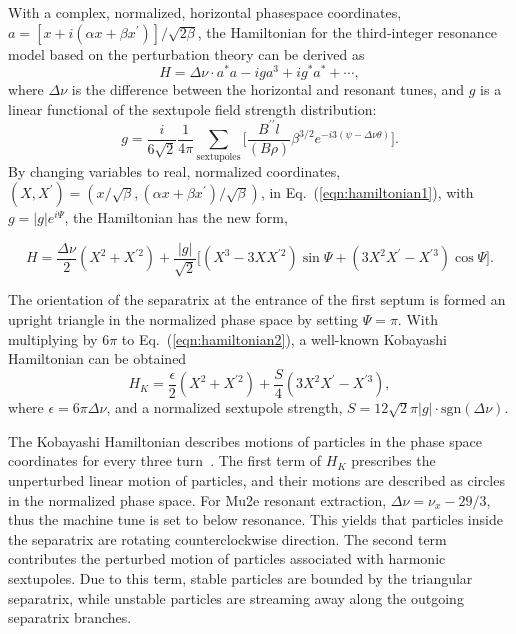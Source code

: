 \documentclass[aps,prstab,onecolumn,preprint]{revtex4-1}
\begin{document}
With a complex, normalized, horizontal phasespace coordinates, $a = [x + i (\alpha x + \beta x^{\prime})] / \sqrt{2 \beta}$, the Hamiltonian for the third-integer resonance model based on the perturbation theory can be derived as~\cite{preliminary}
\begin{equation}
  H = \Delta \nu \cdot a^{*} a - i g a^{3} + i g^{*} a^{*} + \cdots,
\label{eqn:hamiltonian1}
\end{equation}
where $\Delta \nu$ is the difference between the horizontal and resonant tunes, and $g$ is  a linear functional of the sextupole field strength distribution:
\begin{equation*}
  g = \frac{i}{6 \sqrt{2}} \frac{1}{4 \pi} \sum_{\text{sextupoles}}
      \Bigg[
        \frac{B^{\prime\prime} l}{(B\rho)} \beta^{3/2}
        e^{-i 3(\psi - \Delta \nu \theta)}
      \Bigg].
\end{equation*}
By changing variables to real, normalized coordinates, $(X, X^{\prime}) = (x/\sqrt{\beta}, (\alpha x + \beta x^{\prime}) / \sqrt{\beta})$, in Eq.~(\ref{eqn:hamiltonian1}), with $g = |g| e^{i \Psi}$, the Hamiltonian has the new form,
\begin{widetext}
\begin{equation}
  H = \frac{\Delta \nu}{2} \left( X^{2} + X^{\prime2} \right)
    + \frac{|g|}{\sqrt{2}}
      \Big[
        \left( X^{3} - 3 X X^{\prime 2} \right) \sin{\Psi}
      + \left( 3 X^{2} X^{\prime} - X^{\prime 3} \right) \cos{\Psi}
      \Big].
\label{eqn:hamiltonian2}
\end{equation}
\end{widetext}
The orientation of the separatrix at the entrance of the first septum is formed an upright triangle in the normalized phase space by setting $\Psi = \pi$. With multiplying by $6 \pi$ to Eq.~(\ref{eqn:hamiltonian2}), a well-known Kobayashi Hamiltonian can be obtained
\begin{equation}
  H_{K} = \frac{\epsilon}{2} \left( X^{2} + X^{\prime2} \right)
    + \frac{S}{4} \left( 3 X^{2} X^{\prime} - X^{\prime 3} \right),
\label{eqn:kobayashi}
\end{equation}
where $\epsilon = 6\pi \Delta \nu$, and a normalized sextupole strength, $S = 12\sqrt{2} \pi |g| \cdot \text{sgn}(\Delta \nu)$. 

The Kobayashi Hamiltonian describes motions of particles in the phase space coordinates for every three turn~\cite{kobayashi}.
The first term of $H_{K}$ prescribes the unperturbed linear motion of particles, and their motions are described as circles in the normalized phase space. For Mu2e resonant extraction, $\Delta \nu = \nu_{x} - 29/3$, thus the machine tune is set to below resonance. This yields that particles inside the separatrix are rotating counterclockwise direction. The second term contributes the perturbed motion of particles associated with harmonic sextupoles. Due to this term, stable particles are bounded by the triangular separatrix, while unstable particles are streaming away along the outgoing separatrix branches. 
\end{document}
